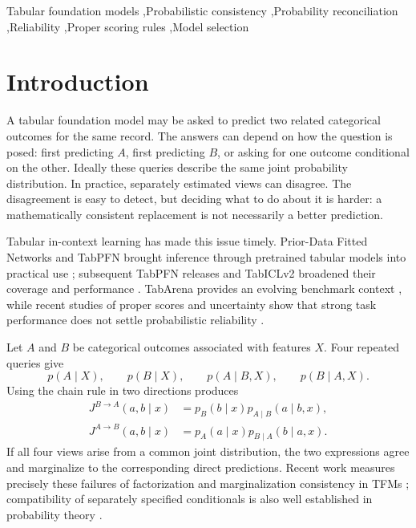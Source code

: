 \documentclass[a4paper,fleqn]{cas-sc}
\newcommand{\Jone}{J^{B\rightarrow A}}
\newcommand{\Jtwo}{J^{A\rightarrow B}}
\begin{document}
\begin{keywords}
Tabular foundation models \sep Probabilistic consistency \sep Probability reconciliation \sep Reliability \sep Proper scoring rules \sep Model selection
\end{keywords}

\maketitle

\section{Introduction}
A tabular foundation model may be asked to predict two related categorical outcomes for the same record. The answers can depend on how the question is posed: first predicting $A$, first predicting $B$, or asking for one outcome conditional on the other. Ideally these queries describe the same joint probability distribution. In practice, separately estimated views can disagree. The disagreement is easy to detect, but deciding what to do about it is harder: a mathematically consistent replacement is not necessarily a better prediction.

Tabular in-context learning has made this issue timely. Prior-Data Fitted Networks and TabPFN brought inference through pretrained tabular models into practical use \citep{muller2022pfns,hollmann2023tabpfn,hollmann2025tabpfn}; subsequent TabPFN releases and TabICLv2 broadened their coverage and performance \citep{grinsztajn2025tabpfn25,grinsztajn2026tabpfn3,qu2026tabiclv2}. TabArena provides an evolving benchmark context \citep{erickson2025tabarena}, while recent studies of proper scores and uncertainty show that strong task performance does not settle probabilistic reliability \citep{landsgesell2026scoringbench,johnson2026uq,costa2026lowreliability,tanna2026ensembling}.

Let $A$ and $B$ be categorical outcomes associated with features $X$. Four repeated queries give
\begin{equation}
p(A\mid X),\qquad p(B\mid X),\qquad p(A\mid B,X),\qquad p(B\mid A,X).
\end{equation}
Using the chain rule in two directions produces
\begin{align}
\Jone(a,b\mid x)&=p_B(b\mid x)p_{A\mid B}(a\mid b,x),\\
\Jtwo(a,b\mid x)&=p_A(a\mid x)p_{B\mid A}(b\mid a,x).
\end{align}
If all four views arise from a common joint distribution, the two expressions agree and marginalize to the corresponding direct predictions. Recent work measures precisely these failures of factorization and marginalization consistency in TFMs \citep{klotergens2026agree}; compatibility of separately specified conditionals is also well established in probability theory \citep{majid2025consistent,mure2019compromise}.
\end{document}
